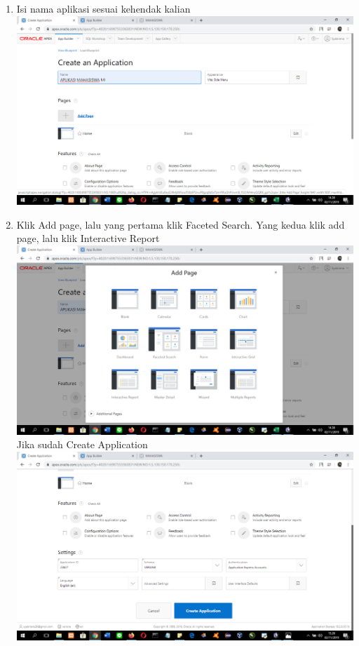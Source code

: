 \begin{enumerate}
\item Isi nama aplikasi sesuai kehendak kalian\\
\includegraphics[scale= 0.3]{gambar/gambar18.png}\\

\item Klik Add page, lalu yang pertama klik Faceted Search. Yang kedua klik add page, lalu klik Interactive Report\\
\includegraphics[scale= 0.3]{gambar/gambar19.png}\\
Jika sudah Create Application\\
\includegraphics[scale= 0.3]{gambar/gambar20.png}\\


\end{enumerate}
